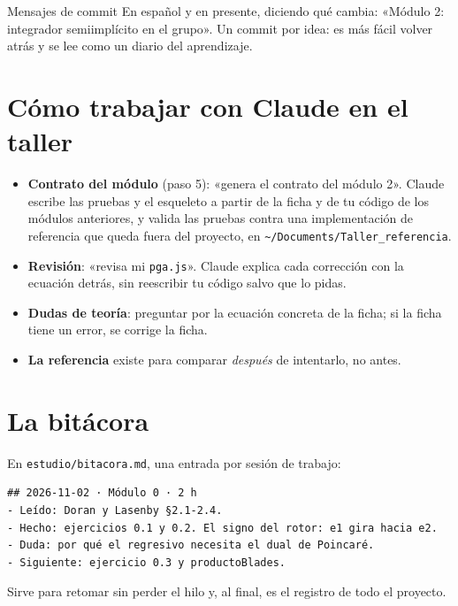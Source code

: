 \documentclass[11pt,a4paper]{article}
\begin{document}
\begin{nota}{Mensajes de commit}
En español y en presente, diciendo qué cambia: «Módulo 2: integrador semiimplícito en el grupo». Un commit por idea:
es más fácil volver atrás y se lee como un diario del aprendizaje.
\end{nota}

\section{Cómo trabajar con Claude en el taller}

\begin{itemize}[leftmargin=*]
  \item \textbf{Contrato del módulo} (paso 5): «genera el contrato del módulo 2». Claude escribe las pruebas y el
        esqueleto a partir de la ficha y de tu código de los módulos anteriores, y valida las pruebas contra una
        implementación de referencia que queda fuera del proyecto, en \texttt{\textasciitilde/Documents/Taller\_referencia}.
  \item \textbf{Revisión}: «revisa mi \texttt{pga.js}». Claude explica cada corrección con la ecuación detrás, sin
        reescribir tu código salvo que lo pidas.
  \item \textbf{Dudas de teoría}: preguntar por la ecuación concreta de la ficha; si la ficha tiene un error, se
        corrige la ficha.
  \item \textbf{La referencia} existe para comparar \emph{después} de intentarlo, no antes.
\end{itemize}

\section{La bitácora}

En \texttt{estudio/bitacora.md}, una entrada por sesión de trabajo:
\begin{lstlisting}
## 2026-11-02 · Módulo 0 · 2 h
- Leído: Doran y Lasenby §2.1-2.4.
- Hecho: ejercicios 0.1 y 0.2. El signo del rotor: e1 gira hacia e2.
- Duda: por qué el regresivo necesita el dual de Poincaré.
- Siguiente: ejercicio 0.3 y productoBlades.
\end{lstlisting}
Sirve para retomar sin perder el hilo y, al final, es el registro de todo el proyecto.
\end{document}
